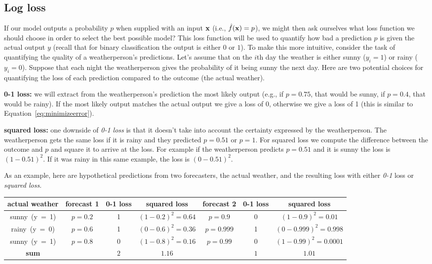 \documentclass[assignment03_Solutions]{subfiles}
\begin{document}
\subsection{Log loss}
If our model outputs a probability $p$ when supplied with an input $\mathbf{x}$ (i.e., $\hat{f}(\mathbf{x}) = p$), we might then ask ourselves what loss function we should choose in order to select the best possible model?  This loss function will be used to quantify how bad a prediction $p$ is given the actual output $y$ (recall that for binary classification the output is either $0$ or $1$).  To make this more intuitive, consider the task of quantifying the quality of a weatherperson's predictions.  Let's assume that on the $i$th day the weather is either sunny ($y_i = 1$) or rainy ($y_i = 0$).  Suppose that each night the weatherperson gives the probability of it being sunny the next day.  Here are two potential choices for quantifying the loss of each prediction compared to the outcome (the actual weather).
\be
\item \textbf{0-1 loss:} we will extract from the weatherperson's prediction the most likely output (e.g., if $p = 0.75$, that would be sunny, if $p = 0.4$, that would be rainy).  If the most likely output matches the actual output we give a loss of 0, otherwise we give a loss of 1 (this is similar to Equation~\ref{eq:minimizeerror}).
\item \textbf{squared loss:} one downside of \emph{0-1 loss} is that it doesn't take into account the certainty expressed by the weatherperson.  The weatherperson gets the same loss if it is rainy and they predicted $p = 0.51$ or $p = 1$.  For squared loss we compute the difference between the outcome and $p$ and square it to arrive at the loss.  For example if the weatherperson predicts $p = 0.51$ and it is sunny the loss is $(1 - 0.51)^2$.  If it was rainy in this same example, the loss is $(0 - 0.51)^2$.
\ee

As an example, here are hypothetical predictions from two forecasters, the actual weather, and the resulting loss with either \emph{0-1} loss or \emph{squared loss}.


\begin{table*}
\centering
\begin{tabular}{c | c | c | c | c | c | c}
\hline
actual weather & forecast 1 & 0-1 loss & squared loss & forecast 2 & 0-1 loss & squared loss \\
\hline
\mbox{sunny (y = 1)} & $p = 0.2$ & 1 & $(1-0.2)^2 = 0.64$ & $p = 0.9$ & 0 & $(1 - 0.9)^2 = 0.01$\\
\mbox{rainy (y = 0)} & $p = 0.6$  & 1 & $(0-0.6)^2 = 0.36$ & $p = 0.999$ & 1 & $(0 - 0.999)^2 = 0.998$ \\ 
\mbox{sunny (y = 1)} & $p = 0.8$ & 0 & $(1-0.8)^2 = 0.16$ & $p = 0.99$ & 0 & $(1 - 0.99)^2 = 0.0001$\\
\hline
\textbf{sum} & & $2$ & $1.16$ & & $1$ & $1.01$
\end{tabular}
\end{table*}
\end{document}
